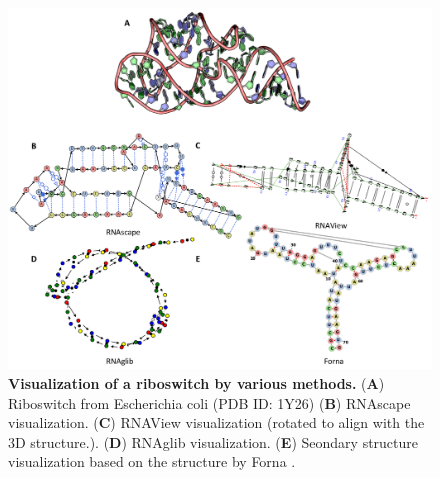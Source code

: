 \begin{center}
\begin{figure}[H]
  \includegraphics[width=\linewidth]{./rnascapefigs/figureS3.png}
    \caption[Visualization of a riboswitch by various methods.]{\textbf{Visualization of a riboswitch by various methods.} ({\bf A}) Riboswitch from Escherichia coli (PDB ID: 1Y26) ({\bf B}) RNAscape visualization. ({\bf C}) RNAView \citep{Yang2003} visualization (rotated to align with the 3D structure.). ({\bf D}) RNAglib \citep{Mallet2022} visualization. ({\bf E}) Seondary structure visualization based on the structure by Forna \citep{Kerpedjiev2015}.}
  \label{fig:rnascapeS3}
\end{figure}
\end{center}

